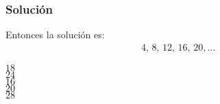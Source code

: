 \begin{frame}
\frametitle{Solución}
Entonces la solución es:
\begin{align*}
  4, \, 8, \, 12, \, 16, \, 20, \ldots
\end{align*}
\begin{choices}
\choice $18$ \\
\choice $24$ \\
\choice $16$ \\
\choice $20$ \\
\choice $28$ \\
\end{choices}
\pause
{}
\end{frame}

